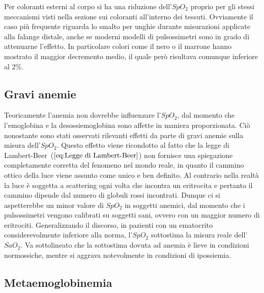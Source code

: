 \documentclass[a4paper, 12pt]{book}
\begin{document}
Per coloranti esterni al corpo si ha una riduzione dell'$SpO_2$ proprio per gli stessi meccanismi visti nella sezione sui coloranti all'interno dei tessuti.
Ovviamente il caso più frequente riguarda lo smalto per unghie durante misurazioni applicate alla falange distale, anche se moderni modelli di pulsossimetri sono in grado di attenuarne l'effetto.
In particolare colori come il nero o il marrone hanno mostrato il maggior decremento medio, il quale però risultava comunque inferiore al 2\%\cite{Pulseoximeter}.%


\subsection{Gravi anemie}

Teoricamente l'anemia non dovrebbe influenzare l'$SpO_2$, dal momento che l'emoglobina e la desossiemoglobina sono affette in maniera proporzionata.
Ciò nonostante sono stati osservati rilevanti effetti da parte di gravi anemie sulla misura dell'$SpO_2$.
Questo effetto viene ricondotto al fatto che la legge di Lambert-Beer~($\ref{eq:Legge di Lambert-Beer}$) non fornisce una spiegazione completamente corretta del fenomeno nel mondo reale, in quanto il cammino ottico della luce viene assunto come unico e ben definito.
Al contrario nella realtà la luce è soggetta a scattering ogni volta che incontra un eritrocita e pertanto il cammino dipende dal numero di globuli rossi incontrati.
Dunque ci si aspetterebbe un minor valore di $SpO_2$ in soggetti anemici, dal momento che i pulsossimetri vengono calibrati su soggetti sani, ovvero con un maggior numero di eritrociti.
Generalizzando il discorso, in pazienti con un ematocrito considerevolmente inferiore alla norma, l'$SpO_2$ sottostima la misura reale dell'$SaO_2$.
Va sottolineato che la sottostima dovuta ad anemia è lieve in condizioni normossiche, mentre si aggrava notevolmente in condizioni di ipossiemia.


\subsection{Metaemoglobinemia}
\end{document}
